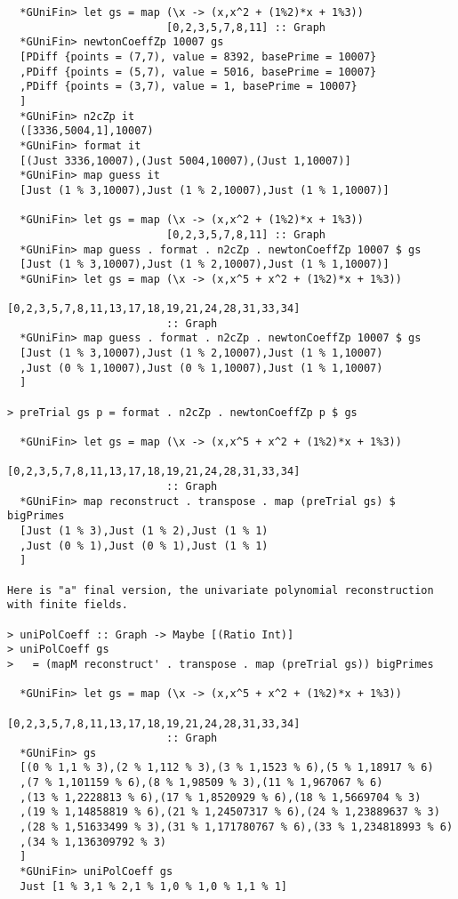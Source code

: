 \documentclass[11pt]{book}
\begin{document}
\begin{verbatim}
  *GUniFin> let gs = map (\x -> (x,x^2 + (1%2)*x + 1%3)) 
                         [0,2,3,5,7,8,11] :: Graph 
  *GUniFin> newtonCoeffZp 10007 gs
  [PDiff {points = (7,7), value = 8392, basePrime = 10007}
  ,PDiff {points = (5,7), value = 5016, basePrime = 10007}
  ,PDiff {points = (3,7), value = 1, basePrime = 10007}
  ]
  *GUniFin> n2cZp it
  ([3336,5004,1],10007)
  *GUniFin> format it
  [(Just 3336,10007),(Just 5004,10007),(Just 1,10007)]
  *GUniFin> map guess it
  [Just (1 % 3,10007),Just (1 % 2,10007),Just (1 % 1,10007)]

  *GUniFin> let gs = map (\x -> (x,x^2 + (1%2)*x + 1%3)) 
                         [0,2,3,5,7,8,11] :: Graph 
  *GUniFin> map guess . format . n2cZp . newtonCoeffZp 10007 $ gs
  [Just (1 % 3,10007),Just (1 % 2,10007),Just (1 % 1,10007)]
  *GUniFin> let gs = map (\x -> (x,x^5 + x^2 + (1%2)*x + 1%3)) 
                         [0,2,3,5,7,8,11,13,17,18,19,21,24,28,31,33,34] 
                         :: Graph 
  *GUniFin> map guess . format . n2cZp . newtonCoeffZp 10007 $ gs
  [Just (1 % 3,10007),Just (1 % 2,10007),Just (1 % 1,10007)
  ,Just (0 % 1,10007),Just (0 % 1,10007),Just (1 % 1,10007)
  ] 

> preTrial gs p = format . n2cZp . newtonCoeffZp p $ gs

  *GUniFin> let gs = map (\x -> (x,x^5 + x^2 + (1%2)*x + 1%3)) 
                         [0,2,3,5,7,8,11,13,17,18,19,21,24,28,31,33,34] 
                         :: Graph 
  *GUniFin> map reconstruct . transpose . map (preTrial gs) $ bigPrimes 
  [Just (1 % 3),Just (1 % 2),Just (1 % 1)
  ,Just (0 % 1),Just (0 % 1),Just (1 % 1)
  ]

Here is "a" final version, the univariate polynomial reconstruction 
with finite fields.

> uniPolCoeff :: Graph -> Maybe [(Ratio Int)]
> uniPolCoeff gs
>   = (mapM reconstruct' . transpose . map (preTrial gs)) bigPrimes

  *GUniFin> let gs = map (\x -> (x,x^5 + x^2 + (1%2)*x + 1%3)) 
                         [0,2,3,5,7,8,11,13,17,18,19,21,24,28,31,33,34]
                         :: Graph
  *GUniFin> gs
  [(0 % 1,1 % 3),(2 % 1,112 % 3),(3 % 1,1523 % 6),(5 % 1,18917 % 6)
  ,(7 % 1,101159 % 6),(8 % 1,98509 % 3),(11 % 1,967067 % 6)
  ,(13 % 1,2228813 % 6),(17 % 1,8520929 % 6),(18 % 1,5669704 % 3)
  ,(19 % 1,14858819 % 6),(21 % 1,24507317 % 6),(24 % 1,23889637 % 3)
  ,(28 % 1,51633499 % 3),(31 % 1,171780767 % 6),(33 % 1,234818993 % 6)
  ,(34 % 1,136309792 % 3)
  ]
  *GUniFin> uniPolCoeff gs
  Just [1 % 3,1 % 2,1 % 1,0 % 1,0 % 1,1 % 1]


\end{verbatim}
\end{document}

